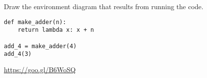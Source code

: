 \begin{blocksection}
\question Draw the environment diagram that results from running the code.

\begin{lstlisting}
def make_adder(n):
    return lambda x: x + n

add_4 = make_adder(4)
add_4(3)
\end{lstlisting}

\begin{solution}[2in]
\url{https://goo.gl/B6WoSQ}
\end{solution}
\end{blocksection}

